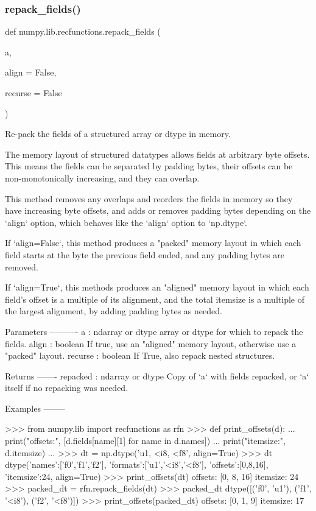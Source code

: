 \subsubsection{\texorpdfstring{repack\+\_\+fields()}{repack\_fields()}}
{\footnotesize\ttfamily def numpy.\+lib.\+recfunctions.\+repack\+\_\+fields (\begin{DoxyParamCaption}\item[{}]{a,  }\item[{}]{align = {\ttfamily False},  }\item[{}]{recurse = {\ttfamily False} }\end{DoxyParamCaption})}

\begin{DoxyVerb}Re-pack the fields of a structured array or dtype in memory.

The memory layout of structured datatypes allows fields at arbitrary
byte offsets. This means the fields can be separated by padding bytes,
their offsets can be non-monotonically increasing, and they can overlap.

This method removes any overlaps and reorders the fields in memory so they
have increasing byte offsets, and adds or removes padding bytes depending
on the `align` option, which behaves like the `align` option to `np.dtype`.

If `align=False`, this method produces a "packed" memory layout in which
each field starts at the byte the previous field ended, and any padding
bytes are removed.

If `align=True`, this methods produces an "aligned" memory layout in which
each field's offset is a multiple of its alignment, and the total itemsize
is a multiple of the largest alignment, by adding padding bytes as needed.

Parameters
----------
a : ndarray or dtype
   array or dtype for which to repack the fields.
align : boolean
   If true, use an "aligned" memory layout, otherwise use a "packed" layout.
recurse : boolean
   If True, also repack nested structures.

Returns
-------
repacked : ndarray or dtype
   Copy of `a` with fields repacked, or `a` itself if no repacking was
   needed.

Examples
--------

>>> from numpy.lib import recfunctions as rfn
>>> def print_offsets(d):
...     print("offsets:", [d.fields[name][1] for name in d.names])
...     print("itemsize:", d.itemsize)
...
>>> dt = np.dtype('u1, <i8, <f8', align=True)
>>> dt
dtype({'names':['f0','f1','f2'], 'formats':['u1','<i8','<f8'], 'offsets':[0,8,16], 'itemsize':24}, align=True)
>>> print_offsets(dt)
offsets: [0, 8, 16]
itemsize: 24
>>> packed_dt = rfn.repack_fields(dt)
>>> packed_dt
dtype([('f0', 'u1'), ('f1', '<i8'), ('f2', '<f8')])
>>> print_offsets(packed_dt)
offsets: [0, 1, 9]
itemsize: 17\end{DoxyVerb}
 \mbox{\label{namespacenumpy_1_1lib_1_1recfunctions_ac2697fba5b0b645c4e6328b1c113e921}} 
